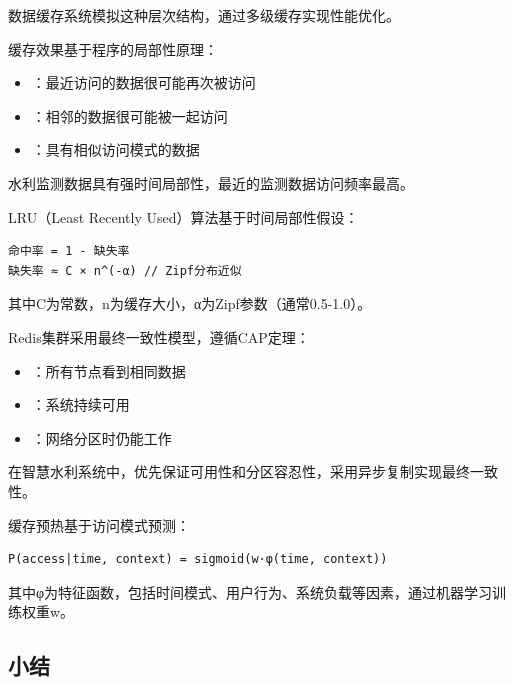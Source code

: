 数据缓存系统模拟这种层次结构，通过多级缓存实现性能优化。


缓存效果基于程序的局部性原理：

\begin{itemize}
\tightlist
\item
  ：最近访问的数据很可能再次被访问
\item
  ：相邻的数据很可能被一起访问
\item
  ：具有相似访问模式的数据
\end{itemize}

水利监测数据具有强时间局部性，最近的监测数据访问频率最高。


LRU（Least Recently Used）算法基于时间局部性假设：

\begin{lstlisting}
命中率 = 1 - 缺失率
缺失率 ≈ C × n^(-α) // Zipf分布近似
\end{lstlisting}

其中C为常数，n为缓存大小，α为Zipf参数（通常0.5-1.0）。


Redis集群采用最终一致性模型，遵循CAP定理：

\begin{itemize}
\tightlist
\item
  ：所有节点看到相同数据
\item
  ：系统持续可用\\
\item
  ：网络分区时仍能工作
\end{itemize}

在智慧水利系统中，优先保证可用性和分区容忍性，采用异步复制实现最终一致性。


缓存预热基于访问模式预测：

\begin{lstlisting}
P(access|time, context) = sigmoid(w·φ(time, context))
\end{lstlisting}

其中φ为特征函数，包括时间模式、用户行为、系统负载等因素，通过机器学习训练权重w。

\hypertarget{ux5c0fux7ed3}{%
\subsection{小结}\label{ux5c0fux7ed3}}

